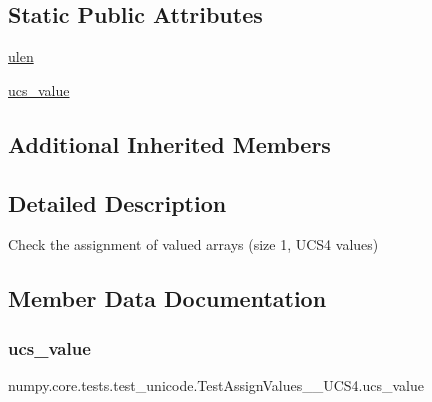 \subsection*{Static Public Attributes}
\begin{DoxyCompactItemize}
\item 
\hyperlink{classnumpy_1_1core_1_1tests_1_1test__unicode_1_1TestAssignValues__1__UCS4_a6e3a72e53e5f568b1af09c979d46186a}{ulen}
\item 
\hyperlink{classnumpy_1_1core_1_1tests_1_1test__unicode_1_1TestAssignValues__1__UCS4_aab3817fac72ca02e737c26bf0ea8265a}{ucs\+\_\+value}
\end{DoxyCompactItemize}
\subsection*{Additional Inherited Members}


\subsection{Detailed Description}
\begin{DoxyVerb}Check the assignment of valued arrays (size 1, UCS4 values)\end{DoxyVerb}
 

\subsection{Member Data Documentation}
\mbox{\label{classnumpy_1_1core_1_1tests_1_1test__unicode_1_1TestAssignValues__1__UCS4_aab3817fac72ca02e737c26bf0ea8265a}} 
\subsubsection{\texorpdfstring{ucs\+\_\+value}{ucs\_value}}
{\footnotesize\ttfamily numpy.\+core.\+tests.\+test\+\_\+unicode.\+Test\+Assign\+Values\+\_\+\_\+\+U\+C\+S4.\+ucs\+\_\+value\hspace{0.3cm}{\ttfamily [static]}}

